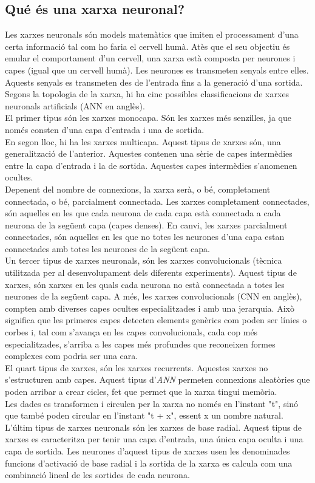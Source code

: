 \documentclass[a4paper,12pt]{article}
\begin{document}
\subsection*{Qué és una xarxa neuronal?}
Les xarxes neuronals són models matemàtics que imiten el processament d'una certa informació tal com ho faria el cervell humà. Atès que el seu objectiu és emular el comportament d'un cervell, una xarxa està composta per neurones i capes (igual que un cervell humà). Les neurones es transmeten senyals entre elles. Aquests senyals es transmeten des de l'entrada fins a la generació d'una sortida.\\
Segons la topologia de la xarxa, hi ha cinc possibles classificacions de xarxes neuronals artificials (ANN en anglès).\\
El primer tipus són les xarxes monocapa. Són les xarxes més senzilles, ja que només consten d'una capa d'entrada i una de sortida.\\
En segon lloc, hi ha les xarxes multicapa. Aquest tipus de xarxes són, una generalització de l'anterior. Aquestes contenen una sèrie de capes intermèdies entre la capa d'entrada i la de sortida. Aquestes capes intermèdies s'anomenen ocultes.\\
Depenent del nombre de connexions, la xarxa serà, o bé, completament connectada, o bé, parcialment connectada. Les xarxes completament connectades, són aquelles en les que cada neurona de cada capa està connectada a cada neurona de la següent capa (capes denses). En canvi, les xarxes parcialment connectades, són aquelles en les que no totes les neurones d'una capa estan connectades amb totes les neurones de la següent capa.\\
Un tercer tipus de xarxes neuronals, són les xarxes convolucionals (tècnica utilitzada per al desenvolupament dels diferents experiments). Aquest tipus de xarxes, són xarxes en les quals cada neurona no està connectada a totes les neurones de la següent capa. A més, les xarxes convolucionals (CNN en anglès), compten amb diverses capes ocultes especialitzades i amb una jerarquia. Això significa que les primeres capes detecten elements genèrics com poden ser línies o corbes i, tal com s'avança en les capes convolucionals, cada cop més especialitzades, s'arriba a les capes més profundes que reconeixen formes complexes com podria ser una cara.\\
El quart tipus de xarxes, són les xarxes recurrents. Aquestes xarxes no s'estructuren amb capes. Aquest tipus d'\textit{ANN} permeten connexions aleatòries que poden arribar a crear cicles, fet que permet que la xarxa tingui memòria.\\
Les dades es transformen i circulen per la xarxa no només en l'instant "t", sinó que també poden circular en l'instant "t + x", essent x un nombre natural.\\
L'últim tipus de xarxes neuronals són les xarxes de base radial. Aquest tipus de xarxes es caracteritza per tenir una capa d'entrada, una única capa oculta i una capa de sortida. Les neurones d'aquest tipus de xarxes usen les denominades funcions d'activació de base radial i la sortida de la xarxa es calcula com una combinació lineal de les sortides de cada neurona.
\end{document}
